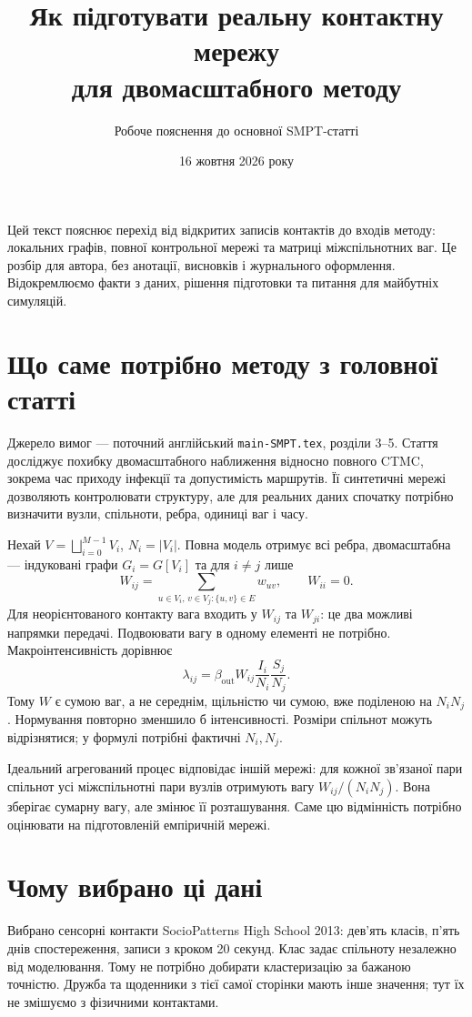 \documentclass[11pt,a4paper]{article}
\title{Як підготувати реальну контактну мережу\\для двомасштабного методу}
\author{Робоче пояснення до основної SMPT-статті}
\date{16 жовтня 2026 року}
\begin{document}
\maketitle
\noindent Цей текст пояснює перехід від відкритих записів контактів до входів методу: локальних графів, повної контрольної мережі та матриці міжспільнотних ваг. Це розбір для автора, без анотації, висновків і журнального оформлення. Відокремлюємо факти з даних, рішення підготовки та питання для майбутніх симуляцій.

\section{Що саме потрібно методу з головної статті}
Джерело вимог --- поточний англійський \texttt{main-SMPT.tex}, розділи 3--5. Стаття досліджує похибку двомасштабного наближення відносно повного CTMC, зокрема час приходу інфекції та допустимість маршрутів. Її синтетичні мережі дозволяють контролювати структуру, але для реальних даних спочатку потрібно визначити вузли, спільноти, ребра, одиниці ваг і часу.

Нехай $V=\bigsqcup_{i=0}^{M-1}V_i$, $N_i=|V_i|$. Повна модель отримує всі ребра, двомасштабна --- індуковані графи $G_i=G[V_i]$ та для $i\ne j$ лише
\[
W_{ij}=\sum_{u\in V_i,\,v\in V_j:\{u,v\}\in E}w_{uv},\qquad W_{ii}=0.
\]
Для неорієнтованого контакту вага входить у $W_{ij}$ та $W_{ji}$: це два можливі напрямки передачі. Подвоювати вагу в одному елементі не потрібно. Макроінтенсивність дорівнює
\[
\lambda_{ij}=\beta_{\mathrm{out}}W_{ij}\frac{I_i}{N_i}\frac{S_j}{N_j}.
\]
Тому $W$ є сумою ваг, а не середнім, щільністю чи сумою, вже поділеною на $N_iN_j$. Нормування повторно зменшило б інтенсивності. Розміри спільнот можуть відрізнятися; у формулі потрібні фактичні $N_i,N_j$.

Ідеальний агрегований процес відповідає іншій мережі: для кожної зв'язаної пари спільнот усі міжспільнотні пари вузлів отримують вагу $W_{ij}/(N_iN_j)$. Вона зберігає сумарну вагу, але змінює її розташування. Саме цю відмінність потрібно оцінювати на підготовленій емпіричній мережі.

\section{Чому вибрано ці дані}
Вибрано сенсорні контакти SocioPatterns High School 2013: дев'ять класів, п'ять днів спостереження, записи з кроком 20 секунд. Клас задає спільноту незалежно від моделювання. Тому не потрібно добирати кластеризацію за бажаною точністю. Дружба та щоденники з тієї самої сторінки мають інше значення; тут їх не змішуємо з фізичними контактами.
\end{document}
